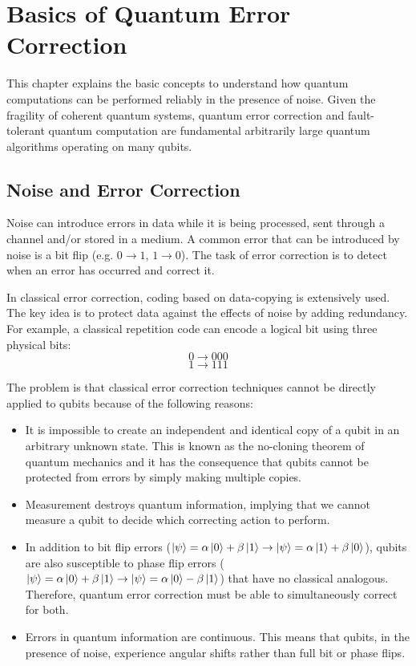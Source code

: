 %
%
\chapter {Basics of Quantum Error Correction}

This chapter explains the basic concepts to understand how quantum computations can be performed reliably in the presence of noise. Given the fragility of coherent quantum systems, quantum error correction and fault-tolerant quantum computation are fundamental arbitrarily large quantum algorithms operating on many qubits.

\section{Noise and Error Correction}

Noise can introduce errors in data while it is being processed, sent through a channel and/or stored in a medium. A common error that can be introduced by noise is a bit flip (e.g. $0 \rightarrow 1$, $1 \rightarrow 0$). The task of error correction is to detect when an error has occurred and correct it.

In classical error correction, coding based on data-copying is extensively used. The key idea is to protect data against the effects of noise by adding redundancy. For example, a classical repetition code can encode a logical bit using three physical bits:
$$0 \rightarrow 000$$
$$1 \rightarrow 111$$

The problem is that classical error correction techniques cannot be directly applied to qubits because of the following reasons:
\begin{itemize}
    \item It is impossible to create an independent and identical copy of a qubit in an arbitrary unknown state. This is known as the no-cloning theorem of quantum mechanics and it has the consequence that qubits cannot be protected from errors by simply making multiple copies.
    \item Measurement destroys quantum information, implying that we cannot measure a qubit to decide which correcting action to perform.
    \item In addition to bit flip errors ($\left|{\psi}\right\rangle=\alpha\left|{0}\right\rangle+\beta\left|{1}\right\rangle \rightarrow \left|{\psi}\right\rangle=\alpha\left|{1}\right\rangle+\beta\left|{0}\right\rangle$), qubits are also susceptible to phase flip errors ($\left|{\psi}\right\rangle=\alpha\left|{0}\right\rangle+\beta\left|{1}\right\rangle \rightarrow \left|{\psi}\right\rangle=\alpha\left|{0}\right\rangle-\beta\left|{1}\right\rangle$) that have no classical analogous. Therefore, quantum error correction must be able to simultaneously correct for both.
    \item Errors in quantum information are continuous. This means that qubits, in the presence of noise, experience angular shifts rather than full bit or phase flips.
\end{itemize}


